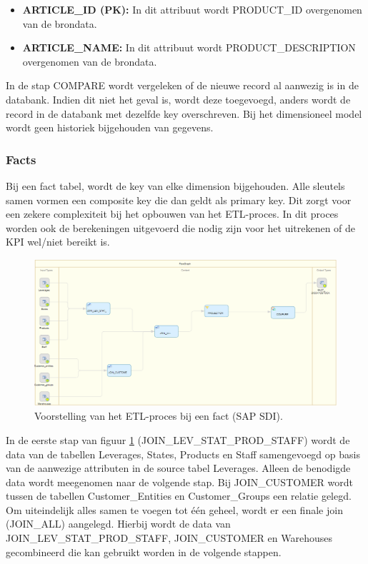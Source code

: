 \begin{itemize}
	\item \textbf{ARTICLE\_ID (PK):} In dit attribuut wordt PRODUCT\_ID overgenomen van de brondata.
	\item \textbf{ARTICLE\_NAME:} In dit attribuut wordt PRODUCT\_DESCRIPTION overgenomen van de brondata.
\end{itemize} 

In de stap COMPARE wordt vergeleken of de nieuwe record al aanwezig is in de databank. Indien dit niet het geval is, wordt deze toegevoegd, anders wordt de record in de databank met dezelfde key overschreven. Bij het dimensioneel model wordt geen historiek bijgehouden van gegevens.

\subsubsection{Facts}
Bij een fact tabel, wordt de key van elke dimension bijgehouden. Alle sleutels samen vormen een composite key die dan geldt als primary key. Dit zorgt voor een zekere complexiteit bij het opbouwen van het ETL-proces. In dit proces worden ook de berekeningen uitgevoerd die nodig zijn voor het uitrekenen of de KPI wel/niet bereikt is.

\begin{figure}[h]
	\centering
	\includegraphics[scale=0.5]{../images/DM_FG_fact.png}
	\caption{Voorstelling van het ETL-proces bij een fact (SAP SDI).}
	\label{fig:DM_FG_fac}
\end{figure}

In de eerste stap van figuur \ref{fig:DM_FG_fac} (JOIN\_LEV\_STAT\_PROD\_STAFF) wordt de data van de tabellen Leverages, States, Products en Staff samengevoegd op basis van de aanwezige attributen in de source tabel Leverages. Alleen de benodigde data wordt meegenomen naar de volgende stap. Bij JOIN\_CUSTOMER wordt tussen de tabellen Customer\_Entities en Customer\_Groups een relatie gelegd. Om uiteindelijk alles samen te voegen tot één geheel, wordt er een finale join (JOIN\_ALL) aangelegd. Hierbij wordt de data van JOIN\_LEV\_STAT\_PROD\_STAFF, JOIN\_CUSTOMER en Warehouses gecombineerd die kan gebruikt worden in de volgende stappen.

